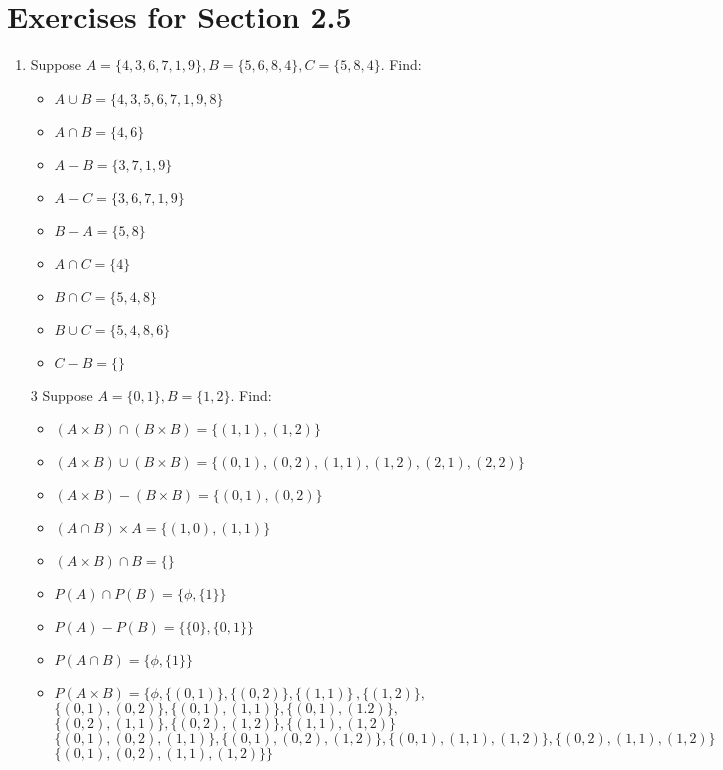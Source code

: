 \documentclass[12pt]{article}
\begin{document}
\section*{Exercises for Section 2.5}
\begin{enumerate}
    \item Suppose $A = \{4,3,6,7,1,9\}, B=\{5,6,8,4\}, C=\{5,8,4\}$. Find:
	\begin{multicols}{2}
	\begin{itemize}
	    \item $A\cup B = \{4,3,5,6,7,1,9,8\}$
	    \item $A\cap B = \{4,6\}$
	    \item $A- B = \{3,7,1,9\}$
	    \item $A- C = \{3,6,7,1,9\}$
	    \item $B- A = \{5,8\}$
	    \item $A\cap C = \{4\}$
	    \item $B\cap C = \{5,4,8\}$
	    \item $B\cup C = \{5,4,8,6\}$
	    \item $C- B = \{\}$
	\end{itemize}
	\end{multicols}
    \item[3] Suppose $A = \{0,1\}, B=\{1,2\}$. Find:
	\begin{itemize}
	    \item $(A\times B)\cap(B\times B)=\{(1,1), (1,2)\}$
	    \item $(A\times B)\cup(B\times B)=\{(0,1), (0,2), (1,1), (1,2), (2,1), (2,2)\}$
	    \item $(A\times B)-(B\times B)=\{(0,1), (0,2)\}$
	    \item $(A\cap B)\times A=\{(1,0), (1,1)\}$
	    \item $(A\times B)\cap B=\{\}$
	    \item $P(A)\cap P(B)=\{\phi, \{1\}\}$
	    \item $P(A)- P(B)=\{\{0\}, \{0,1\}\}$
	    \item $P(A\cap B)=\{\phi, \{1\}\}$
	    \item $P(A\times B)=\{\phi, \{ (0,1)\}, \{(0,2)\}, \{(1,1)\}\,,\{(1,2)\},$\\
		$\{(0,1), (0,2)\}, \{(0,1), (1,1)\}, \{(0,1), (1.2)\},$\\
		$\{(0,2), (1,1)\}, \{(0,2), (1,2)\}, \{(1,1), (1,2)\}$\\
		$\{(0,1), (0,2), (1,1)\}, \{(0,1), (0,2), (1,2)\}, \{(0,1), (1,1), (1,2)\}, \{(0,2), (1,1), (1,2)\}$\\
		$\{(0,1), (0,2), (1,1), (1,2)\}\}$
	\end{itemize}
\end{enumerate}
\end{document}
